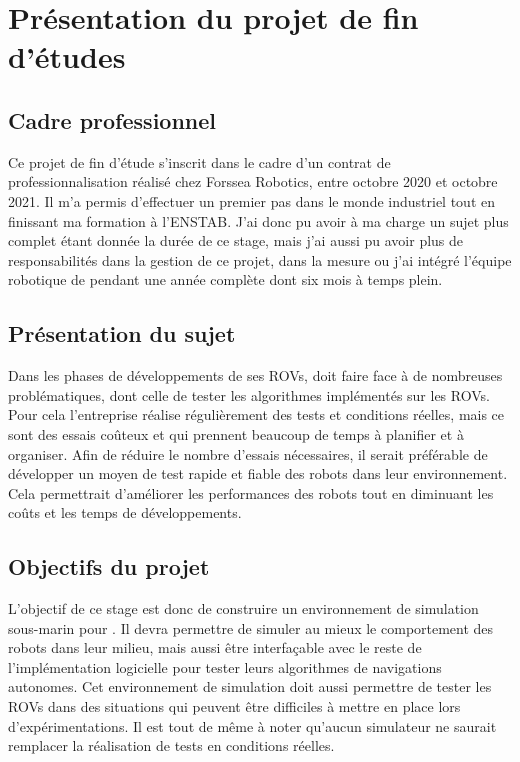 	\section[Projet de fin d'études]{Présentation du projet de fin d'études}

		\subsection{Cadre professionnel}

			Ce projet de fin d'étude s'inscrit dans le cadre d'un contrat de professionnalisation réalisé chez Forssea Robotics, entre octobre 2020 et octobre 2021. Il m'a permis d'effectuer un premier pas dans le monde industriel tout en finissant ma formation à l'\gls{ENSTAB}. J'ai donc pu avoir à ma charge un sujet plus complet étant donnée la durée de ce stage, mais j'ai aussi pu avoir plus de responsabilités dans la gestion de ce projet, dans la mesure ou j'ai intégré l'équipe robotique de \forssea{} pendant une année complète dont six mois à temps plein.

		\subsection{Présentation du sujet}

			Dans les phases de développements de ses \gls{ROV}s, \forssea{} doit faire face à de nombreuses problématiques, dont celle de tester les algorithmes implémentés sur les \gls{ROV}s. Pour cela l'entreprise réalise régulièrement des tests et conditions réelles, mais ce sont des essais coûteux et qui prennent beaucoup de temps à planifier et à organiser. Afin de réduire le nombre d'essais nécessaires, il serait préférable de développer un moyen de test rapide et fiable des robots dans leur environnement. Cela permettrait d'améliorer les performances des robots tout en diminuant les coûts et les temps de développements.

		\subsection{Objectifs du projet}

			L'objectif de ce stage est donc de construire un environnement de simulation sous-marin pour \forssea{}. Il devra permettre de simuler au mieux le comportement des robots dans leur milieu, mais aussi être interfaçable avec le reste de l'implémentation logicielle pour tester leurs algorithmes de navigations autonomes. Cet environnement de simulation doit aussi permettre de tester les \gls{ROV}s dans des situations qui peuvent être difficiles à mettre en place lors d'expérimentations. Il est tout de même à noter qu'aucun simulateur ne saurait remplacer la réalisation de tests en conditions réelles.

	